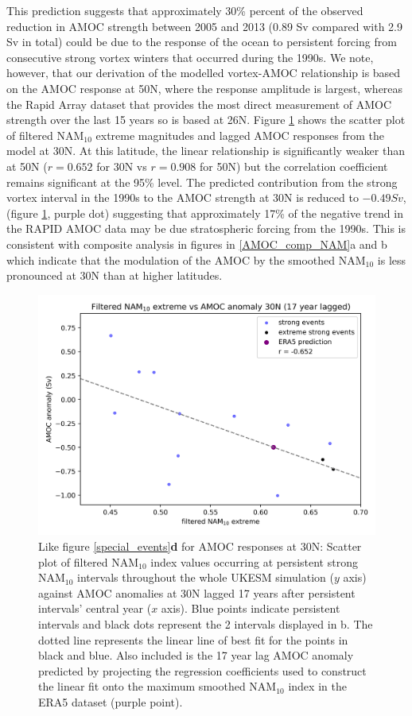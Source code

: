 This prediction suggests that approximately 30\% percent of the observed reduction in AMOC strength  between 2005 and 2013 (0.89 Sv compared with 2.9 Sv in total) could be due to the response of the ocean to persistent forcing from consecutive strong vortex winters that occurred during the 1990s. We note, however, that our derivation of the modelled vortex-AMOC relationship is based on the AMOC response at 50N, where the response amplitude is largest, whereas the Rapid Array dataset that provides the most direct measurement of AMOC strength over the last 15 years so is based at 26N.  Figure \ref{special_events_30} shows the scatter plot of filtered NAM$_{10}$ extreme magnitudes and lagged AMOC responses from the model at 30N. At this latitude, the linear relationship is significantly weaker than at 50N ($r = 0.652$ for 30N vs $r = 0.908$ for 50N) but the correlation coefficient remains significant at the 95\% level. The predicted contribution from the strong vortex interval in the 1990s to the AMOC strength at 30N is reduced to $-0.49Sv$,  (figure \ref{special_events_30}, purple dot) suggesting that  approximately 17\% of the negative trend in the RAPID AMOC data may be due stratospheric forcing from the 1990s. This is consistent with composite analysis in figures in \ref{AMOC_comp_NAM}a and b which indicate that the modulation of the AMOC by the smoothed NAM$_{10}$ is less pronounced at 30N than at higher latitudes.

\begin{figure}[h!]
\begin{center}
\noindent\includegraphics[width = 0.6\linewidth]{Figures/Figures-surface/AMOC_response_special_events_30N_AMOC.png} 
\caption{Like figure \ref{special_events}\textbf{d} for AMOC responses at 30N: Scatter plot of filtered NAM$_{10}$ index values occurring at persistent strong NAM$_{10}$ intervals throughout the whole UKESM simulation ($y$ axis) against AMOC anomalies at 30N lagged 17 years after persistent intervals' central year ($x$ axis). Blue points indicate persistent intervals and black dots represent the 2 intervals displayed in b. The dotted line represents the linear line of best fit for the points in black and blue. Also included is the 17 year lag AMOC anomaly predicted by projecting the regression coefficients used to construct the linear fit onto the maximum smoothed NAM$_{10}$ index in the ERA5 dataset (purple point).}
\label{special_events_30}
\end{center}
\end{figure}

